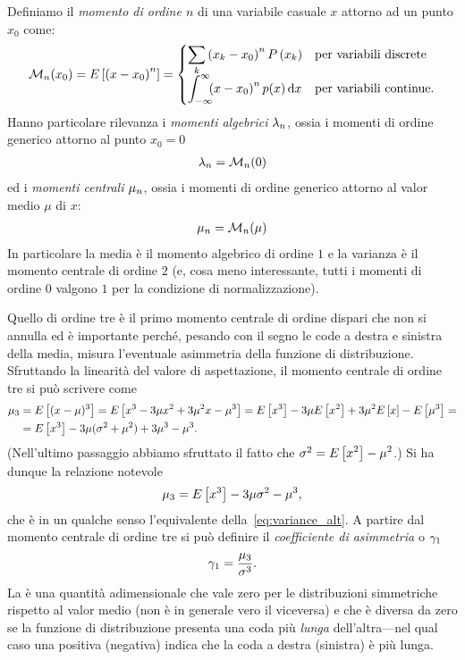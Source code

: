 Definiamo il \emph{momento di ordine $n$} di una variabile casuale $x$ attorno
ad un punto $x_0$ come:
\begin{align}
  \dccases[.]{\mom[x_0]{n} = \expect{\power[n]{x - x_0}}}%
          {\sum_k \power[n]{x_k - x_0}\prob{x_k}}%
          {\intinf \power[n]{x - x_0}p(x)\diff}
\end{align}
Hanno particolare rilevanza i \emph{momenti algebrici} $\displaystyle \lambda_{n}$, ossia i
momenti di ordine generico attorno al punto $x_0 = 0$
\begin{align}
  \momalg{n} = \mom[0]{n}
\end{align}
ed i \emph{momenti centrali} $\displaystyle \mu_{n}$, ossia i momenti di ordine generico
attorno al valor medio $\mu$ di $x$:
\begin{align}
  \momcen{n} = \mom[\mu]{n}
\end{align}
In particolare la media è il momento algebrico di ordine $1$ e la varianza
è il momento centrale di ordine $2$ (e, cosa meno interessante, tutti i
momenti di ordine $0$ valgono $1$ per la condizione di normalizzazione).

Quello di ordine tre è il primo momento centrale di ordine dispari che
non si annulla ed è importante perché, pesando con il segno le code a destra
e sinistra della media, misura l'eventuale asimmetria della funzione di
distribuzione. Sfruttando la linearità del valore di aspettazione, il
momento centrale di ordine tre si può scrivere come
\begin{align*}
  \displaystyle \mu_{3} & = \displaystyle E\left[(x - \mu)^3\right] =
  \displaystyle E\left[x^3 - 3\mu x^2 + 3\mu^2 x - \mu^3\right] =
  \displaystyle E\left[x^3\right] - 3\mu\displaystyle E\left[x^2\right] + 3\mu^2\displaystyle E\left[x\right] -
  \displaystyle E\left[\mu^3\right] =\\\nonumber
  & = \displaystyle E\left[x^3\right] - 3\mu(\sigma^2 + \mu^2) + 3\mu^3 - \mu^3.
\end{align*}
(Nell'ultimo passaggio abbiamo sfruttato il fatto che
$\sigma^2 = \displaystyle E\left[x^2\right] - \mu^2$.) Si ha dunque la relazione notevole
\begin{align}\label{eq:momcen3}
  \displaystyle \mu_{3} = \displaystyle E\left[x^3\right] - 3\mu\sigma^2 - \mu^3,
\end{align}
che è in un qualche senso l'equivalente della~\eqref{eq:variance_alt}.
A partire dal momento centrale di ordine tre si può definire il
\emph{coefficiente di asimmetria} o  $\displaystyle \gamma_1$
\begin{align}
  \displaystyle \gamma_1 = \frac{\displaystyle \mu_{3}}{\sigma^3}.
\end{align}
La  è una quantità adimensionale che vale zero per le
distribuzioni simmetriche rispetto al valor medio (non è in generale vero
il viceversa) e che è diversa da zero se la funzione di distribuzione
presenta una coda più \emph{lunga} dell'altra---nel qual caso una
 positiva (negativa) indica che la coda a destra (sinistra)
è più lunga.


